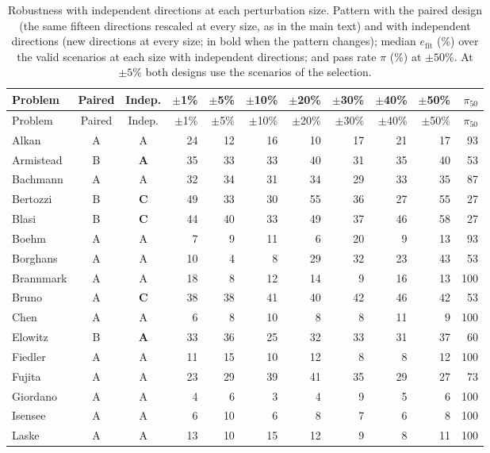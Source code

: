 \begin{longtable}{@{}lccrrrrrrrr@{}}
\caption{Robustness with independent directions at each perturbation size. Pattern with the paired design (the same fifteen directions rescaled at every size, as in the main text) and with independent directions (new directions at every size; in bold when the pattern changes); median $e_{\mathrm{fit}}$ (\%) over the valid scenarios at each size with independent directions; and pass rate $\pi$ (\%) at $\pm50\%$. At $\pm5\%$ both designs use the scenarios of the selection.}\label{tab:robindep}\\
\toprule
Problem & Paired & Indep. & $\pm$1\% & $\pm$5\% & $\pm$10\% & $\pm$20\% & $\pm$30\% & $\pm$40\% & $\pm$50\% & $\pi_{50}$ \\
\midrule
\endfirsthead
\toprule
Problem & Paired & Indep. & $\pm$1\% & $\pm$5\% & $\pm$10\% & $\pm$20\% & $\pm$30\% & $\pm$40\% & $\pm$50\% & $\pi_{50}$ \\
\midrule
\endhead
Alkan & A & A & 24 & 12 & 16 & 10 & 17 & 21 & 17 & 93 \\
Armistead & B & \textbf{A} & 35 & 33 & 33 & 40 & 31 & 35 & 40 & 53 \\
Bachmann & A & A & 32 & 34 & 31 & 34 & 29 & 33 & 35 & 87 \\
Bertozzi & B & \textbf{C} & 49 & 33 & 30 & 55 & 36 & 27 & 55 & 27 \\
Blasi & B & \textbf{C} & 44 & 40 & 33 & 49 & 37 & 46 & 58 & 27 \\
Boehm & A & A & 7 & 9 & 11 & 6 & 20 & 9 & 13 & 93 \\
Borghans & A & A & 10 & 4 & 8 & 29 & 32 & 23 & 43 & 53 \\
Brannmark & A & A & 18 & 8 & 12 & 14 & 9 & 16 & 13 & 100 \\
Bruno & A & \textbf{C} & 38 & 38 & 41 & 40 & 42 & 46 & 42 & 53 \\
Chen & A & A & 6 & 8 & 10 & 8 & 8 & 11 & 9 & 100 \\
Elowitz & B & \textbf{A} & 33 & 36 & 25 & 32 & 33 & 31 & 37 & 60 \\
Fiedler & A & A & 11 & 15 & 10 & 12 & 8 & 8 & 12 & 100 \\
Fujita & A & A & 23 & 29 & 39 & 41 & 35 & 29 & 27 & 73 \\
Giordano & A & A & 4 & 6 & 3 & 4 & 9 & 5 & 6 & 100 \\
Isensee & A & A & 6 & 10 & 6 & 8 & 7 & 6 & 8 & 100 \\
Laske & A & A & 13 & 10 & 15 & 12 & 9 & 8 & 11 & 100 \\

\end{longtable}
